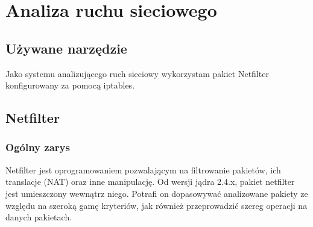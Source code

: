 \chapter{Analiza ruchu sieciowego}
	\section{Używane narzędzie}
		Jako systemu analizującego ruch sieciowy wykorzystam pakiet Netfilter konfigurowany za pomocą iptables.
	\section{Netfilter}
		\subsection{Ogólny zarys}
			Netfilter jest oprogramowaniem pozwalającym na filtrowanie pakietów, ich translacje (NAT) oraz inne manipulację.
			Od wersji jądra 2.4.x, pakiet netfilter jest umieszczony wewnątrz niego.
			Potrafi on dopasowywać analizowane pakiety ze względu na szeroką gamę kryteriów, jak również przeprowadzić szereg operacji na danych pakietach.

